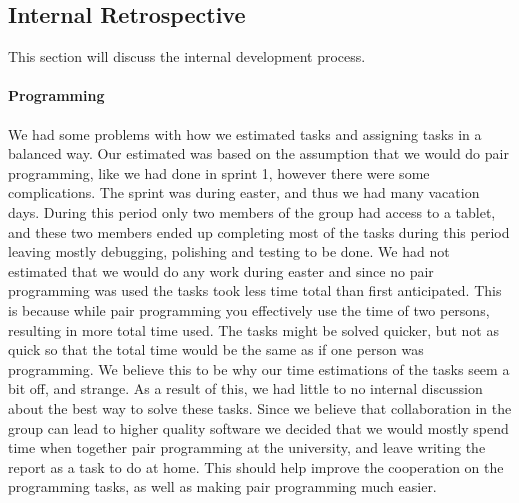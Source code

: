\subsection{Internal Retrospective}\label{internal2}
This section will discuss the internal development process.
\paragraph{Programming}
We had some problems with how we estimated tasks and assigning tasks in a balanced way.
Our estimated was based on the assumption that we would do pair programming, like we had done in sprint 1, however there were some complications. 
The sprint was during easter, and thus we had many vacation days.
During this period only two members of the group had access to a tablet, and these two members ended up completing most of the tasks during this period leaving mostly debugging, polishing and testing to be done.
We had not estimated that we would do any work during easter and since no pair programming was used the tasks took less time total than first anticipated.
This is because while pair programming you effectively use the time of two persons, resulting in more total time used. 
The tasks might be solved quicker, but not as quick so that the total time would be the same as if one person was programming. 
We believe this to be why our time estimations of the tasks seem a bit off, and strange.
As a result of this, we had little to no internal discussion about the best way to solve these tasks. 
Since we believe that collaboration in the group can lead to higher quality software we decided that we would mostly spend time when together pair programming at the university, and leave writing the report as a task to do at home. 
This should help improve the cooperation on the programming tasks, as well as making pair programming much easier.

